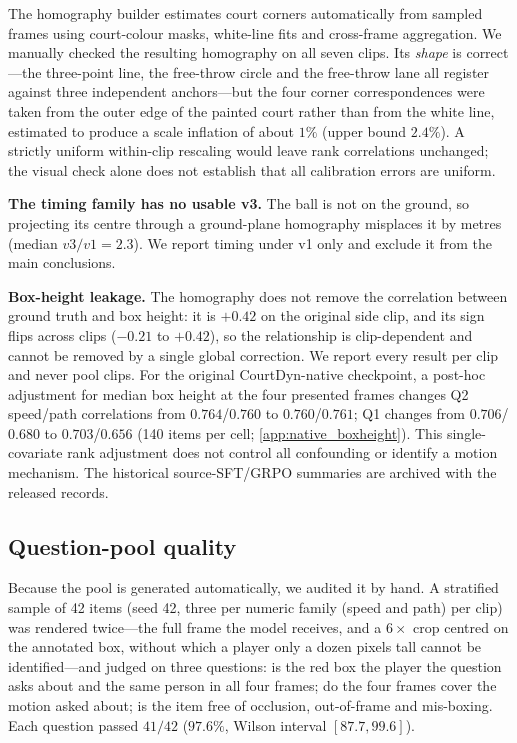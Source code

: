 \documentclass[11pt]{article}
\begin{document}
The homography builder estimates court corners automatically from sampled
frames using court-colour masks, white-line fits and cross-frame aggregation.
We manually checked the resulting homography on all seven clips. Its
\emph{shape} is correct---the three-point line, the free-throw circle and the
free-throw lane all register against three independent anchors---but the four
corner correspondences were taken from the outer edge of the painted court
rather than from the white line, estimated to produce a scale inflation of about $1\%$ (upper bound $2.4\%$).
A strictly uniform within-clip rescaling would leave rank correlations unchanged;
the visual check alone does not establish that all calibration errors are uniform.

\textbf{The timing family has no usable v3.} The ball is not on the ground, so
projecting its centre through a ground-plane homography misplaces it by metres
(median $v3/v1 = 2.3$). We report timing under v1 only and exclude it from the
main conclusions.

\textbf{Box-height leakage.} The homography does not remove the correlation
between ground truth and box height: it is $+0.42$ on the original side clip,
and its sign flips across clips ($-0.21$ to $+0.42$), so the relationship is clip-dependent and cannot be removed by a single
global correction. We report every result per clip and never pool clips. For the original
CourtDyn-native checkpoint, a post-hoc adjustment for median box height at
the four presented frames changes Q2 speed/path correlations from
$0.764$/$0.760$ to $0.760$/$0.761$; Q1 changes from $0.706$/$0.680$ to
$0.703$/$0.656$ (140 items per cell; \ref{app:native_boxheight}). This
single-covariate rank adjustment does not control all confounding or identify
a motion mechanism. The historical source-SFT/GRPO summaries are archived with the released records.

\subsection{Question-pool quality}

Because the pool is generated automatically, we audited it by hand. A
stratified sample of 42 items (seed 42, three per numeric family (speed and path) per clip) was rendered
twice---the full frame the model receives, and a $6\times$ crop centred on the
annotated box, without which a player only a dozen pixels tall cannot be
identified---and judged on three questions: is the red box the player the
question asks about and the same person in all four frames; do the four frames
cover the motion asked about; is the item free of occlusion, out-of-frame and
mis-boxing. Each question passed $41/42$ ($97.6\%$, Wilson interval
$[87.7, 99.6]$).
\end{document}
